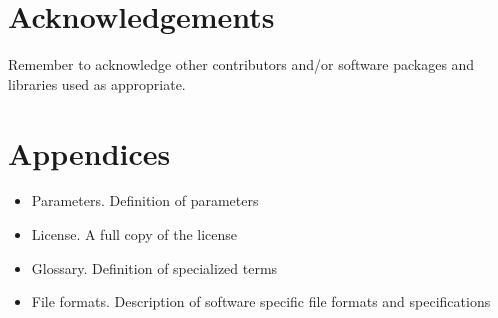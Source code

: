 \documentclass{article}
\renewcommand{\numberline}[1]{#1~}
\begin{document}
\section{Acknowledgements}
Remember to acknowledge other contributors and/or software packages and libraries used as appropriate.

\appendix
\pagebreak

\let\myRefname\refname
\renewcommand\refname{%
  \addcontentsline{toc}{section}{\numberline{}References}
  \myRefname
}



\pagebreak
\section {Appendices}
\begin{itemize}
\item Parameters. Definition of parameters
\item License. A full copy of the license
\item Glossary. Definition of specialized terms
\item File formats. Description of software specific file formats and specifications

\end{itemize}
\end{document}
